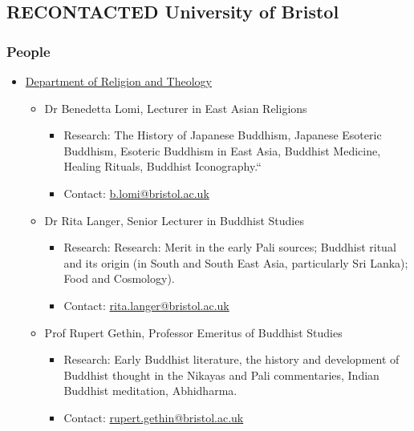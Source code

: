 \documentclass[11pt]{article}
\begin{document}
\subsection*{{\bfseries\sffamily RECONTACTED} University of Bristol}
\label{sec:orgac43879}
\subsubsection*{People}
\label{sec:orgc5384b1}
\begin{itemize}
\item \href{http://www.bristol.ac.uk/religion/}{Department of Religion and Theology}
\label{sec:orgda3080d}
\begin{itemize}
\item Dr Benedetta Lomi, Lecturer in East Asian Religions
\label{sec:orgbf82916}
\begin{itemize}
\item Research: The History of Japanese Buddhism, Japanese Esoteric Buddhism, Esoteric Buddhism in East Asia, Buddhist Medicine, Healing Rituals, Buddhist Iconography.``\\
\item Contact: \href{mailto:b.lomi@bristol.ac.uk}{b.lomi@bristol.ac.uk}\\
\end{itemize}
\item Dr Rita Langer, Senior Lecturer in Buddhist Studies
\label{sec:orgc9d3f4e}
\begin{itemize}
\item Research: Research: Merit in the early Pali sources; Buddhist ritual and its origin (in South and South East Asia, particularly Sri Lanka); Food and Cosmology).\\
\item Contact: \href{mailto:rita.langer@bristol.ac.uk}{rita.langer@bristol.ac.uk}\\
\end{itemize}
\item Prof Rupert Gethin, Professor Emeritus of Buddhist Studies
\label{sec:org016803e}
\begin{itemize}
\item Research: Early Buddhist literature, the history and development of Buddhist thought in the Nikayas and Pali commentaries, Indian Buddhist meditation, Abhidharma.\\
\item Contact: \href{mailto:rupert.gethin@bristol.ac.uk}{rupert.gethin@bristol.ac.uk}\\
\end{itemize}
\end{itemize}
\end{itemize}
\end{document}
